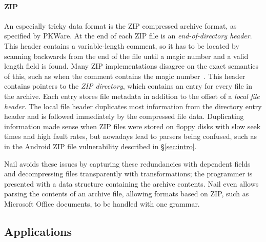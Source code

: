 \paragraph{ZIP} An especially tricky data format is the ZIP compressed archive format, as specified
by PKWare. At the end of each ZIP file is an
\emph{end-of-directory header}. This header contains a variable-length comment, so it has to be
located by scanning backwards from the end of the file until a magic number and a valid length field
is found. Many ZIP implementations disagree on the exact semantics of this, such as when the comment
contains the magic number~\cite{wolf:berlinsides-zip}.
This header  contains pointers to the \emph{ZIP directory}, which contains an entry for every file
in the archive.  Each entry stores file metadata in addition to the
offset of a \emph{local file header}. The local file header duplicates
most information from the directory entry header and is followed immediately by the compressed
file data.
Duplicating information made sense when ZIP files were stored on floppy
disks with slow seek times and high fault rates, but nowadays lead to parsers being confused, such
as in the Android ZIP file vulnerability described in \S\ref{sec:intro}.



Nail avoids these issues by capturing these redundancies with dependent fields and decompressing
files transparently with transformations; the programmer
is presented with a data structure containing the archive contents. Nail even allows parsing the
contents of an archive file, allowing formats based on ZIP, such as Microsoft Office documents, to
be handled with one grammar.



\subsection{Applications}
\label{s:eval-effort}

